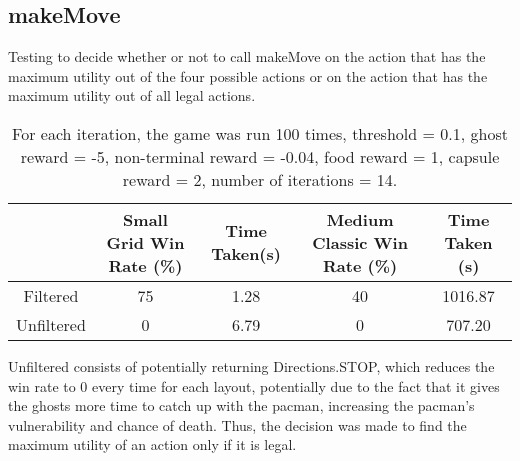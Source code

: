 \documentclass[12pt]{report}
\begin{document}
      \subsection*{makeMove}
      Testing to decide whether or not to call makeMove on the action that has the maximum utility out of the four possible actions or on the action that has the maximum utility out of all legal actions.
        \begin{table}[H]
          \begin{center}
            \begin{adjustbox}{max width=\textwidth}
            \begin{tabular}{*{5}{c}}
              \textbf{} & \textbf{Small Grid Win Rate (\%)} & \textbf{Time Taken(s)} & \textbf{Medium Classic Win Rate (\%)} & \textbf{Time Taken (s)}\\
              \hline
                    Filtered & 75 & 1.28 & 40 & 1016.87\\
                    Unfiltered & 0 & 6.79 & 0 & 707.20\\
            \end{tabular}
            \end{adjustbox}
            \caption{For each iteration, the game was run 100 times, threshold = 0.1, ghost reward = -5, non-terminal reward = -0.04, food reward = 1, capsule reward = 2, number of iterations = 14.}
            \label{tab:table4}
          \end{center}
        \end{table}
        \vspace{-9mm}
        Unfiltered consists of potentially returning Directions.STOP, which reduces the win rate to 0 every time for each layout, potentially due to the fact that it gives the ghosts more time to catch up with the pacman, increasing the pacman's vulnerability and chance of death. Thus, the decision was made to find the maximum utility of an action only if it is legal.
\end{document}
